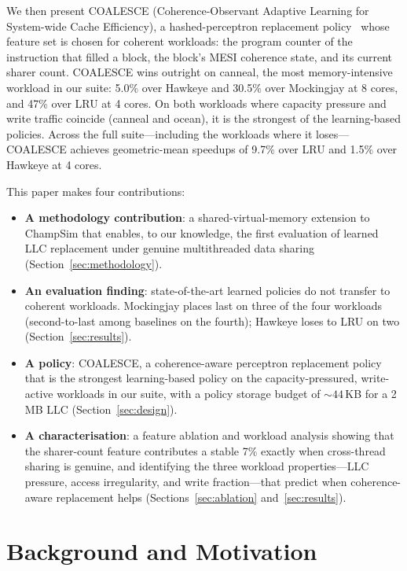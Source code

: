 \documentclass[conference]{IEEEtran}
\begin{document}
We then present COALESCE (Coherence-Observant Adaptive Learning for System-wide Cache Efficiency), a hashed-perceptron replacement policy~\cite{jimenez2001perceptron,jimenez2017multiperspective} whose feature set is chosen for coherent workloads: the program counter of the instruction that filled a block, the block's MESI coherence state, and its current sharer count. COALESCE wins outright on canneal, the most memory-intensive workload in our suite: 5.0\% over Hawkeye and 30.5\% over Mockingjay at 8 cores, and 47\% over LRU at 4 cores. On both workloads where capacity pressure and write traffic coincide (canneal and ocean), it is the strongest of the learning-based policies. Across the full suite---including the workloads where it loses---COALESCE achieves geometric-mean speedups of 9.7\% over LRU and 1.5\% over Hawkeye at 4 cores.

This paper makes four contributions:
\begin{itemize}
  \item \textbf{A methodology contribution}: a shared-virtual-memory extension to ChampSim that enables, to our knowledge, the first evaluation of learned LLC replacement under genuine multithreaded data sharing (Section~\ref{sec:methodology}).
  \item \textbf{An evaluation finding}: state-of-the-art learned policies do not transfer to coherent workloads. Mockingjay places last on three of the four workloads (second-to-last among baselines on the fourth); Hawkeye loses to LRU on two (Section~\ref{sec:results}).
  \item \textbf{A policy}: COALESCE, a coherence-aware perceptron replacement policy that is the strongest learning-based policy on the capacity-pressured, write-active workloads in our suite, with a policy storage budget of ${\sim}44$\,KB for a 2\,MB LLC (Section~\ref{sec:design}).
  \item \textbf{A characterisation}: a feature ablation and workload analysis showing that the sharer-count feature contributes a stable 7\% exactly when cross-thread sharing is genuine, and identifying the three workload properties---LLC pressure, access irregularity, and write fraction---that predict when coherence-aware replacement helps (Sections~\ref{sec:ablation} and~\ref{sec:results}).
\end{itemize}

\section{Background and Motivation}
\label{sec:background}
\end{document}
